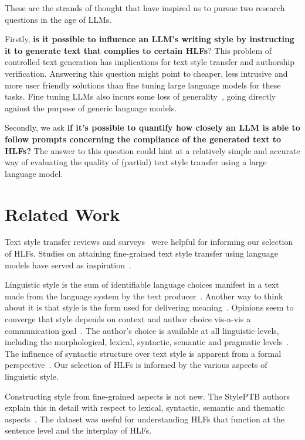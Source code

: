 \documentclass[a4paper,twoside]{article}
\begin{document}
These are the strands of thought that have inspired us to pursue two research
questions in the age of LLMs.

Firstly, \textbf{is it possible to influence an LLM's writing style by
    instructing it to generate text that complies to certain HLFs}?
This problem of controlled text generation has implications for text style
transfer and authorship verification.
Answering this question might point to cheaper, less intrusive and more user
friendly solutions than fine tuning large language models for these tasks.
Fine tuning LLMs also incurs some loss of generality~\cite{yang2024unveiling},
going directly against the purpose of generic language models.

Secondly, we ask \textbf{if it's possible to quantify how closely an LLM is able
    to follow prompts concerning the compliance of the generated text to HLFs?}
The answer to this question could hint at a relatively simple and accurate way
of evaluating the quality of (partial) text style transfer using a large
language model.

\section{Related Work}\label{related}

Text style transfer reviews and surveys~\cite{tst-review-2021,tst-survey-2022}
were helpful for informing our selection of HLFs.
Studies on attaining fine-grained text style transfer using language models
have served as inspiration~\cite{lyu-etal-2023-fine}.

Linguistic style is the sum of identifiable language choices manifest in a text
made from the language system by the text producer~\cite{lugea2023stylistics}.
Another way to think about it is that style is the form used for delivering
meaning~\cite{tst_sigkdd_review_2022}.
Opinions seem to converge that style depends on context and author choice
vis-a-vis a communication goal~\cite{mcdonald1985computational,hovy1987generating}.
The author's choice is available at all linguistic levels, including the
morphological, lexical, syntactic, semantic and pragmatic
levels~\cite{dimarco1994model,lugea2023stylistics}.
The influence of syntactic structure over text style is apparent from a formal
perspective~\cite{chomsky2002syntactic}.
Our selection of HLFs is informed by the various aspects of linguistic style.

Constructing style from fine-grained aspects is not new.
The StylePTB authors explain this in detail with respect to lexical,
syntactic, semantic and thematic aspects~\cite{lyu-etal-2021-styleptb}.
The dataset was useful for understanding HLFs that function at the sentence
level and the interplay of HLFs.
\end{document}
